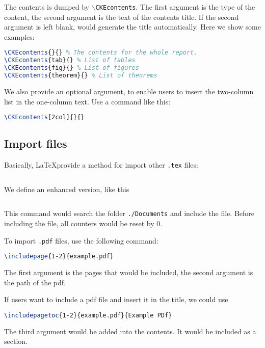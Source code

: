 \begin{multicols}{2}
The contents is dumped by \texttt{$\backslash$CKEcontents}. The first argument is the type of the content, the second argument is the text of the contents title. If the second argument is left blank, would generate the title automatically. Here we show some examples:
\begin{lstlisting}[language=tex]
\CKEcontents{}{} % The contents for the whole report.
\CKEcontents{tab}{} % List of tables
\CKEcontents{fig}{} % List of figures
\CKEcontents{theorem}{} % List of theorems
\end{lstlisting}

We also provide an optional argument, to enable users to insert the two-column list in the one-column text. Use a command like this:
\begin{lstlisting}[language=tex]
\CKEcontents[2col]{}{}
\end{lstlisting}

\subsection{Import files}

Basically, \LaTeX provide a method for import other \texttt{.tex} files:
\begin{lstlisting}[language=tex]

\end{lstlisting}

We define an enhanced version, like this
\begin{lstlisting}[language=tex]

\end{lstlisting}

This command would search the folder \texttt{./Documents} and include the file. Before including the file, all counters would be reset by 0.

To import \texttt{.pdf} files, use the following command:
\begin{lstlisting}[language=tex]
\includepage{1-2}{example.pdf}
\end{lstlisting}

The first argument is the pages that would be included, the second argument is the path of the pdf.

If users want to include a pdf file and insert it in the title, we could use
\begin{lstlisting}[language=tex]
\includepagetoc{1-2}{example.pdf}{Example PDf}
\end{lstlisting}

The third argument would be added into the contents. It would be included as a section.


\end{multicols}
